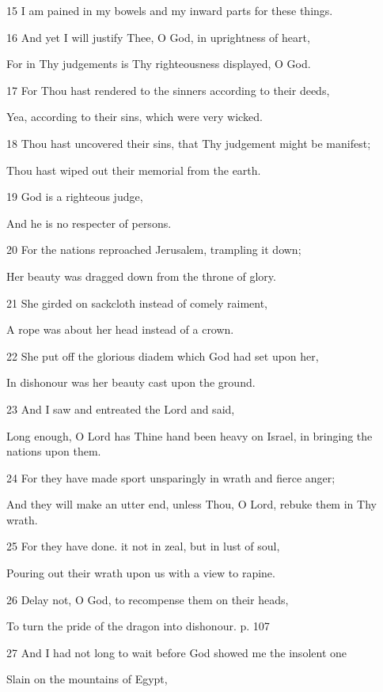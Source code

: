 \par 15 I am pained in my bowels and my inward parts for these things.
\par    
\par 16 And yet I will justify Thee, O God, in uprightness of heart,
\par  For in Thy judgements is Thy righteousness displayed, O God.
\par 17 For Thou hast rendered to the sinners according to their deeds,
\par  Yea, according to their sins, which were very wicked.
\par 18 Thou hast uncovered their sins, that Thy judgement might be manifest;
\par  Thou hast wiped out their memorial from the earth.
\par 19 God is a righteous judge,
\par  And he is no respecter of persons.
\par 20 For the nations reproached Jerusalem, trampling it down;
\par  Her beauty was dragged down from the throne of glory.
\par 21 She girded on sackcloth instead of comely raiment,
\par  A rope was about her head instead of a crown.
\par 22 She put off the glorious diadem which God had set upon her,
\par  In dishonour was her beauty cast upon the ground.
\par 23 And I saw and entreated the Lord and said,
\par  Long enough, O Lord has Thine hand been heavy on Israel, in bringing the nations upon them.
\par 24 For they have made sport unsparingly in wrath and fierce anger;
\par  And they will make an utter end, unless Thou, O Lord, rebuke them in Thy wrath.
\par 25 For they have done. it not in zeal, but in lust of soul,
\par  Pouring out their wrath upon us with a view to rapine.
\par 26 Delay not, O God, to recompense them on their heads,
\par  To turn the pride of the dragon into dishonour. p. 107
\par 27 And I had not long to wait before God showed me the insolent one
\par  Slain on the mountains of Egypt,
